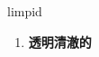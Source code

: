 
\begin{frame}
{\huge limpid}
\begin{center}
\begin{enumerate}\Large
  \item \textbf{透明清澈的}
\end{enumerate}
\end{center}
\end{frame}
